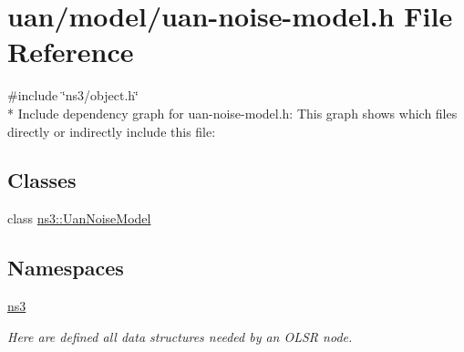 \hypertarget{uan-noise-model_8h}{}\section{uan/model/uan-\/noise-\/model.h File Reference}
\label{uan-noise-model_8h}
{\ttfamily \#include \char`\"{}ns3/object.\+h\char`\"{}}\\*
Include dependency graph for uan-\/noise-\/model.h\+:
This graph shows which files directly or indirectly include this file\+:
\subsection*{Classes}
\begin{DoxyCompactItemize}
\item 
class \hyperlink{classns3_1_1UanNoiseModel}{ns3\+::\+Uan\+Noise\+Model}
\end{DoxyCompactItemize}
\subsection*{Namespaces}
\begin{DoxyCompactItemize}
\item 
 \hyperlink{namespacens3}{ns3}
\begin{DoxyCompactList}\small\item\em Here are defined all data structures needed by an O\+L\+SR node. \end{DoxyCompactList}\end{DoxyCompactItemize}
